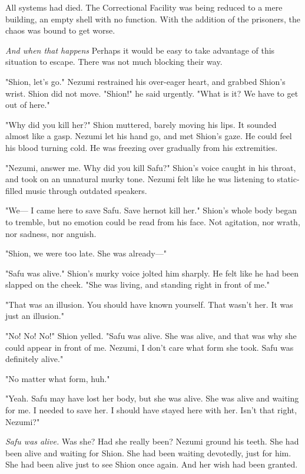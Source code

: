 All systems had died. The Correctional Facility was being reduced to a
mere building, an empty shell with no function. With the addition of the
prisoners, the chaos was bound to get worse.

\emph{And when that happens\el } Perhaps it would be easy to take advantage of
this situation to escape. There was not much blocking their way.

"Shion, let's go." Nezumi restrained his over-eager heart, and grabbed
Shion's wrist. Shion did not move. "Shion!" he said urgently. "What is
it? We have to get out of here."

"Why did you kill her?" Shion muttered, barely moving his lips. It
sounded almost like a gasp. Nezumi let his hand go, and met Shion's
gaze. He could feel his blood turning cold. He was freezing over
gradually from his extremities.

"Nezumi, answer me. Why did you kill Safu?" Shion's voice caught in his
throat, and took on an unnatural murky tone. Nezumi felt like he was
listening to static-filled music through outdated speakers.

"We--- I came here to save Safu. Save her\el not kill her." Shion's whole
body began to tremble, but no emotion could be read from his face. Not
agitation, nor wrath, nor sadness, nor anguish.

"Shion, we were too late. She was already---"

"Safu was alive." Shion's murky voice jolted him sharply. He felt like
he had been slapped on the cheek. "She was living, and standing right in
front of me."

"That was an illusion. You should have known yourself. That wasn't her.
It was just an illusion."

"No! No! No!" Shion yelled. "Safu was alive. She was alive, and that was
why she could appear in front of me. Nezumi, I don't care what form she
took. Safu was definitely alive."

"\el No matter what form, huh."

"Yeah. Safu may have lost her body, but she was alive. She was alive and
waiting for me. I needed to save her. I should have stayed here with
her. Isn't that right, Nezumi?"

\emph{Safu was alive.} Was she? Had she really been? Nezumi ground his teeth.
She had been alive and waiting for Shion. She had been waiting
devotedly, just for him. She had been alive just to see Shion once
again. And her wish had been granted.

